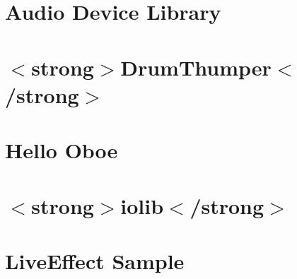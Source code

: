 \let\mypdfximage\pdfximage\def\pdfximage{\immediate\mypdfximage}\documentclass[twoside]{book}
\newcommand{\+}{\discretionary{\mbox{\scriptsize$\hookleftarrow$}}{}{}}
\begin{document}
\chapter{Audio Device Library}
\label{md__c_1__users_fab_src__github_branches__neural_amp_modeler_plugin_i_plug2__dependencies__build_4f50fb0b370228d827b34d4b45a328a6}

\chapter{$<$strong$>$Drum\+Thumper$<$/strong$>$}
\label{md__c_1__users_fab_src__github_branches__neural_amp_modeler_plugin_i_plug2__dependencies__build_0b5f1ca6b59766b813685b8260b760fd}

\chapter{Hello Oboe}
\label{md__c_1__users_fab_src__github_branches__neural_amp_modeler_plugin_i_plug2__dependencies__build_94f3f48d3c55b8c9774e941b97a5880d}

\chapter{$<$strong$>$iolib$<$/strong$>$}
\label{md__c_1__users_fab_src__github_branches__neural_amp_modeler_plugin_i_plug2__dependencies__build_86b7d201ea345ff9c15b26e9758b970b}

\chapter{Live\+Effect Sample}
\label{md__c_1__users_fab_src__github_branches__neural_amp_modeler_plugin_i_plug2__dependencies__build_6afc9e52bb497c3e0cdd9b5585189fad}

\end{document}
